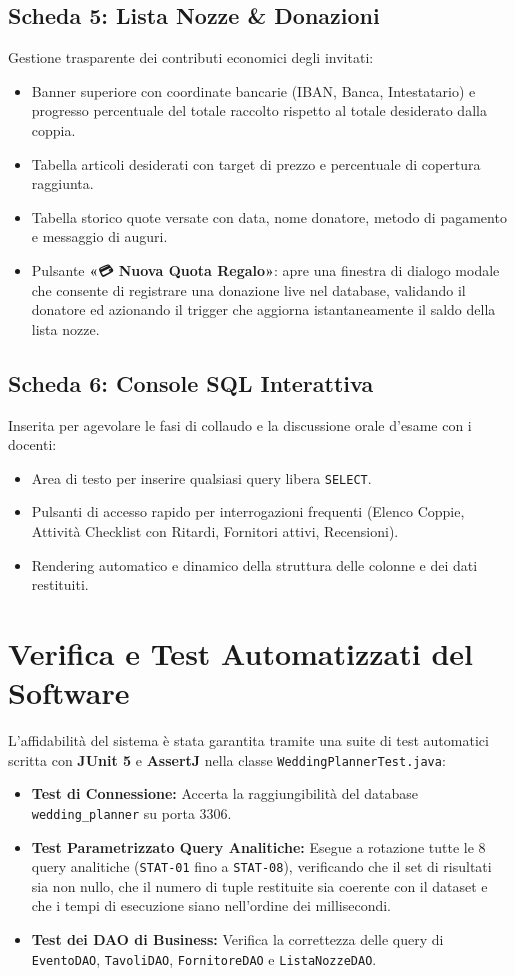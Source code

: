 \subsection{Scheda 5: Lista Nozze \& Donazioni}
Gestione trasparente dei contributi economici degli invitati:
\begin{itemize}[noitemsep]
    \item Banner superiore con coordinate bancarie (IBAN, Banca, Intestatario) e progresso percentuale del totale raccolto rispetto al totale desiderato dalla coppia.
    \item Tabella articoli desiderati con target di prezzo e percentuale di copertura raggiunta.
    \item Tabella storico quote versate con data, nome donatore, metodo di pagamento e messaggio di auguri.
    \item Pulsante \textbf{«💳 Nuova Quota Regalo»}: apre una finestra di dialogo modale che consente di registrare una donazione live nel database, validando il donatore ed azionando il trigger che aggiorna istantaneamente il saldo della lista nozze.
\end{itemize}

\subsection{Scheda 6: Console SQL Interattiva}
Inserita per agevolare le fasi di collaudo e la discussione orale d'esame con i docenti:
\begin{itemize}[noitemsep]
    \item Area di testo per inserire qualsiasi query libera \texttt{SELECT}.
    \item Pulsanti di accesso rapido per interrogazioni frequenti (Elenco Coppie, Attività Checklist con Ritardi, Fornitori attivi, Recensioni).
    \item Rendering automatico e dinamico della struttura delle colonne e dei dati restituiti.
\end{itemize}

\section{Verifica e Test Automatizzati del Software}
L'affidabilità del sistema è stata garantita tramite una suite di test automatici scritta con \textbf{JUnit 5} e \textbf{AssertJ} nella classe \texttt{WeddingPlannerTest.java}:
\begin{itemize}[noitemsep]
    \item \textbf{Test di Connessione:} Accerta la raggiungibilità del database \texttt{wedding\_planner} su porta 3306.
    \item \textbf{Test Parametrizzato Query Analitiche:} Esegue a rotazione tutte le 8 query analitiche (\texttt{STAT-01} fino a \texttt{STAT-08}), verificando che il set di risultati sia non nullo, che il numero di tuple restituite sia coerente con il dataset e che i tempi di esecuzione siano nell'ordine dei millisecondi.
    \item \textbf{Test dei DAO di Business:} Verifica la correttezza delle query di \texttt{EventoDAO}, \texttt{TavoliDAO}, \texttt{FornitoreDAO} e \texttt{ListaNozzeDAO}.
\end{itemize}

